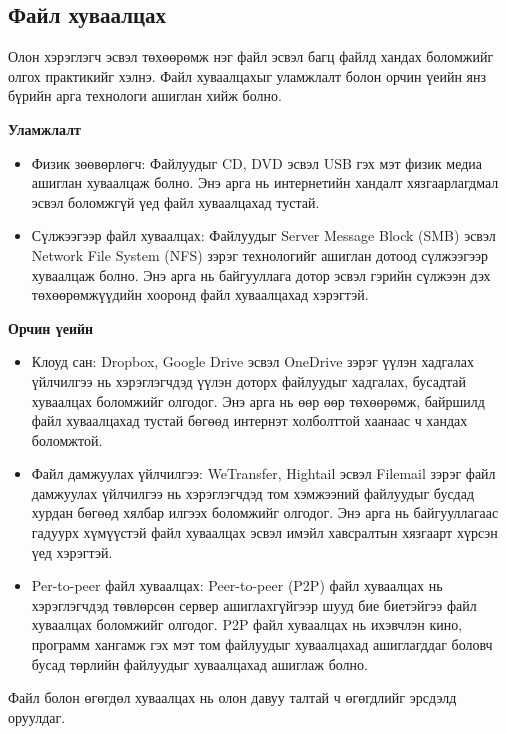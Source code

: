 \subsection{Файл хуваалцах}
Олон хэрэглэгч эсвэл төхөөрөмж нэг файл эсвэл багц файлд хандах боломжийг олгох практикийг хэлнэ. Файл хуваалцахыг уламжлалт болон орчин үеийн янз бүрийн арга технологи ашиглан хийж болно.

\textbf{Уламжлалт}
\begin{itemize}
    \item Физик зөөвөрлөгч: Файлуудыг CD, DVD эсвэл USB гэх мэт физик медиа ашиглан хуваалцаж болно. Энэ арга нь интернетийн хандалт хязгаарлагдмал эсвэл боломжгүй үед файл хуваалцахад тустай.
    \item Сүлжээгээр файл хуваалцах: Файлуудыг Server Message Block (SMB) эсвэл Network File System (NFS) зэрэг технологийг ашиглан дотоод сүлжээгээр хуваалцаж болно. Энэ арга нь байгууллага дотор эсвэл гэрийн сүлжээн дэх төхөөрөмжүүдийн хооронд файл хуваалцахад хэрэгтэй.
\end{itemize}

\textbf{Орчин үеийн}
\begin{itemize}
    \item Клоуд сан: Dropbox, Google Drive эсвэл OneDrive зэрэг үүлэн хадгалах үйлчилгээ нь хэрэглэгчдэд үүлэн доторх файлуудыг хадгалах, бусадтай хуваалцах боломжийг олгодог. Энэ арга нь өөр өөр төхөөрөмж, байршилд файл хуваалцахад тустай бөгөөд интернэт холболттой хаанаас ч хандах боломжтой.
    \item Файл дамжуулах үйлчилгээ: WeTransfer, Hightail эсвэл Filemail зэрэг файл дамжуулах үйлчилгээ нь хэрэглэгчдэд том хэмжээний файлуудыг бусдад хурдан бөгөөд хялбар илгээх боломжийг олгодог. Энэ арга нь байгууллагаас гадуурх хүмүүстэй файл хуваалцах эсвэл имэйл хавсралтын хязгаарт хүрсэн үед хэрэгтэй.
    \item Per-to-peer файл хуваалцах: Peer-to-peer (P2P) файл хуваалцах нь хэрэглэгчдэд төвлөрсөн сервер ашиглахгүйгээр шууд бие биетэйгээ файл хуваалцах боломжийг олгодог. P2P файл хуваалцах нь ихэвчлэн кино, программ хангамж гэх мэт том файлуудыг хуваалцахад ашиглагддаг боловч бусад төрлийн файлуудыг хуваалцахад ашиглаж болно.
\end{itemize}
Файл болон өгөгдөл хуваалцах нь олон давуу талтай ч өгөгдлийг эрсдэлд оруулдаг.

